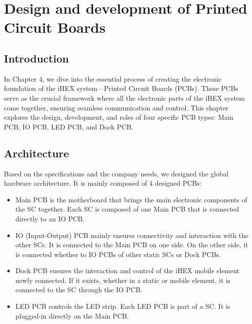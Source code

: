 \chapter{Design and development of Printed Circuit Boards}

\renewcommand{\chaptername}{Chapter}

\section*{Introduction}

In Chapter 4, we dive into the essential process of creating the electronic foundation of the iHEX system—Printed Circuit Boards (PCBs). These PCBs serve as the crucial framework where all the electronic parts of the iHEX system come together, ensuring seamless communication and control. This chapter explores the design, development, and roles of four specific PCB types: Main PCB, IO PCB, LED PCB, and Dock PCB.

\section{Architecture}

Based on the specifications and the company needs, we designed the global hardware architecture. It is mainly composed of 4 designed PCBs:

\begin{itemize}
    \item Main PCB is the motherboard that brings the main electronic components of the SC together. Each SC is composed of one Main PCB that is connected directly to an IO PCB.
    \item IO (Input-Output) PCB mainly ensures connectivity and interaction with the other SCs. It is connected to the Main PCB on one side. On the other side, it is connected whether to IO PCBs of other static SCs or Dock PCBs.
    \item Dock PCB ensures the interaction and control of the iHEX mobile element newly connected. If it exists, whether in a static or mobile element, it is connected to the SC through the IO PCB.
    \item LED PCB controls the LED strip. Each LED PCB is part of a SC. It is plugged-in directly on the Main PCB.
\end{itemize}

